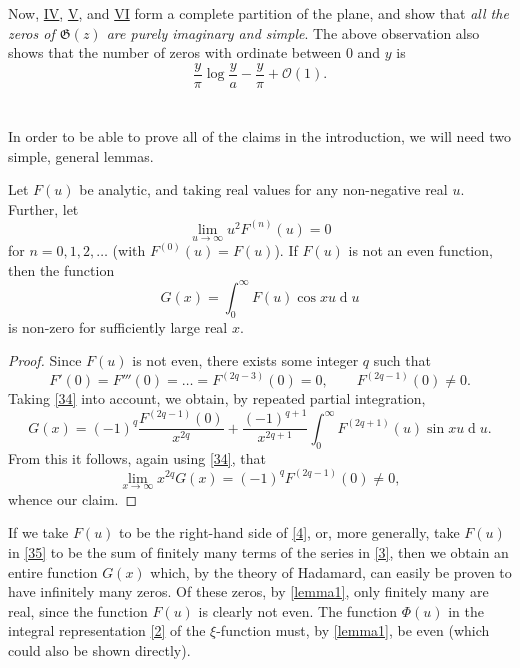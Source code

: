 \documentclass{article}
\theoremstyle{plain}
\newenvironment{lemma}[1]
  {\renewcommand\theinnercustomlemma{#1}\innercustomlemma}
  {\endinnercustomlemma}
\newcommand{\dd}{\operatorname{d}\!}
\newcommand{\GG}{\mathfrak{G}}
\newcommand{\error}{\mathcal{O}}
\newcommand{\oldpage}[1]{\marginpar{\footnotesize$\Big\vert$ \textit{p.~#1}}}
\begin{document}
Now, \hyperref[IV]{IV}, \hyperref[V]{V}, and \hyperref[VI]{VI} form a complete partition of the plane, and show that \emph{all the zeros of $\GG(z)$ are purely imaginary and simple}.
The above observation also shows that the number of zeros with ordinate between $0$ and $y$ is
\[
  \frac{y}{\pi}\log\frac{y}{a} - \frac{y}{\pi} + \error(1).
\]


\section{}
\label{section4}

In order to be able to prove all of the claims in the introduction, we will need two simple, general lemmas.

\begin{lemma}{1}
\label{lemma1}
  Let $F(u)$ be analytic, and taking real values for any non-negative real $u$.
  Further, let
  \[
  \label{34}
    \lim_{u\to\infty} u^2 F^{(n)}(u) = 0
  \tag{34}
  \]
  for $n=0,1,2,\ldots$ (with $F^{(0)}(u)=F(u)$).
  If $F(u)$ is not an even function, then the function
  \[
  \label{35}
    G(x) = \int_0^\infty F(u)\cos xu \dd u
  \tag{35}
  \]
  is non-zero for sufficiently large real $x$.
\end{lemma}
\begin{proof}
  Since $F(u)$ is not even, there exists some integer $q$ such that
  \[
    F'(0) = F'''(0) = \ldots = F^{(2q-3)}(0) = 0,
    \qquad F^{(2q-1)}(0) \neq 0.
  \]
\oldpage{316}
  Taking \cref{34} into account, we obtain, by repeated partial integration,
  \[
    G(x) = (-1)^q \frac{F^{(2q-1)}(0)}{x^{2q}} + \frac{{(-1)^{q+1}}}{x^{2q+1}} \int_0^\infty F^{(2q+1)}(u)\sin xu \dd u.
  \]
  From this it follows, again using \cref{34}, that
  \[
    \lim_{x\to\infty} x^{2q}G(x) = (-1)^q F^{(2q-1)}(0) \neq 0,
  \]
  whence our claim.
\end{proof}

If we take $F(u)$ to be the right-hand side of \cref{4}, or, more generally, take $F(u)$ in \cref{35} to be the sum of finitely many terms of the series in \cref{3}, then we obtain an entire function $G(x)$ which, by the theory of Hadamard, can easily be proven to have infinitely many zeros.
Of these zeros, by \cref{lemma1}, only finitely many are real, since the function $F(u)$ is clearly not even.
The function $\Phi(u)$ in the integral representation \cref{2} of the $\xi$-function must, by \cref{lemma1}, be even (which could also be shown directly).
\end{document}
